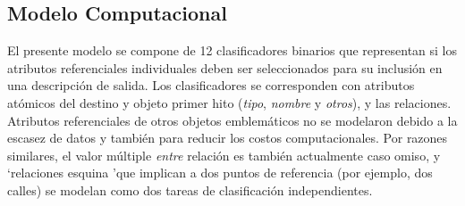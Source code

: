 
\subsection{Modelo Computacional }






El presente modelo se compone de 12 clasificadores binarios que representan si los atributos referenciales individuales deben ser seleccionados para su inclusi\'on en una descripci\'on de salida. Los clasificadores se corresponden con atributos at\'omicos del destino y objeto primer hito ({\em tipo}, {\em nombre } y {\em otros}), y las relaciones. Atributos referenciales de otros objetos emblem\'aticos no se modelaron debido a la escasez de datos y tambi\'en para reducir los costos computacionales. Por razones similares, el valor m\'ultiple {\em entre} relaci\'on es tambi\'en actualmente caso omiso, y `relaciones esquina 'que implican a dos puntos de referencia (por ejemplo, dos calles) se modelan como dos tareas de clasificaci\'on independientes.

